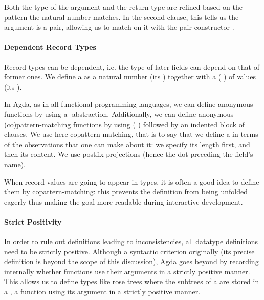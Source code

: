 Both the type of the  argument and the  return type are
refined based on the pattern the natural number matches. In the second clause,
this tells us the  argument is a pair, allowing us to match on it
with the pair constructor \AIC{\_,\_}.



\paragraph{Dependent Record Types}

Record types can be dependent, i.e. the type of later fields can depend on that of
former ones. We define a  as a natural number (its ) together
with a ( ) of values (its ).


In Agda, as in all functional programming languages, we can define anonymous functions
by using a -abstraction. Additionally, we can define anonymous (co)pattern-matching
functions by using ( ) followed by an indented block of clauses.
We use here copattern-matching, that is to say that we define a  in terms
of the observations that one can make about it: we specify its length first, and
then its content. We use postfix projections (hence the dot preceding the field's name).


When record values are going to appear in types, it is often a good idea to define
them by copattern-matching: this prevents the definition from being unfolded eagerly
thus making the goal more readable during interactive development.

\paragraph{Strict Positivity} In order to rule out definitions leading to
inconsistencies, all datatype definitions need to be strictly positive.
Although a syntactic criterion originally (its precise definition is beyond
the scope of this discussion), Agda goes beyond by recording internally
whether functions use their arguments in a strictly positive manner.
This allows us to define types like rose trees where the subtrees of a
 are stored in a , a function using its 
argument in a strictly positive manner.


